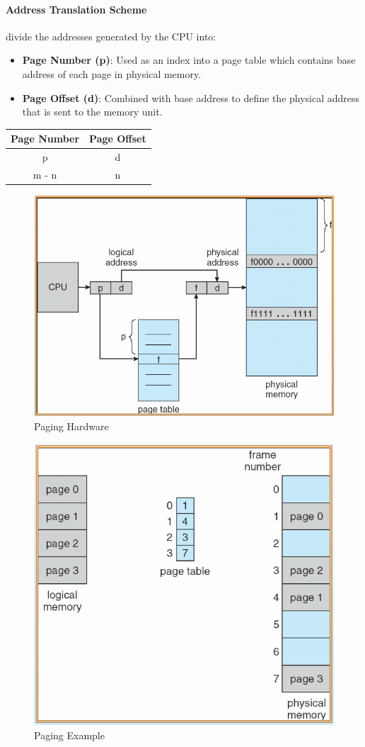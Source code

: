 \documentclass[12pt]{article}
\begin{document}
\paragraph{Address Translation Scheme} divide the addresses generated by the CPU into:
\begin{itemize}
  \item \textbf{Page Number (p)}: Used as an index into a page table which contains base address of each page in physical memory.
  \item \textbf{Page Offset (d)}: Combined with base address to define the physical address that is sent to the memory unit.
\end{itemize}
\begin{center}
  \begin{tabular}{ |c|c| }
    \hline
    \textbf{Page Number} & \textbf{Page Offset}\\
    \hline
    p & d\\
    \hline
    m - n & n\\
    \hline
  \end{tabular}
\end{center}
\begin{figure}[H]
  \centering
  \includegraphics[width=0.8\linewidth]{images/paging.png}
  \caption{Paging Hardware}
  \label{fig:paging}
\end{figure}
\begin{figure}[h]
  \centering
  \includegraphics[width=0.8\linewidth]{images/ex_paging.png}
  \caption{Paging Example}
  \label{fig:ex_paging}
\end{figure}
\end{document}
